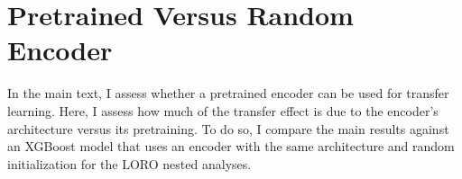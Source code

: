 \documentclass[11pt, letterpaper]{article}
\begin{document}




\section{Pretrained Versus Random Encoder}
\label{app:random}
In the main text, I assess whether a pretrained encoder can be used for transfer learning. Here, I assess how much of the transfer effect is due to the encoder's architecture versus its pretraining. To do so, I compare the main results against an XGBoost model that uses an encoder with the same architecture and random initialization for the LORO nested analyses.
\end{document}
